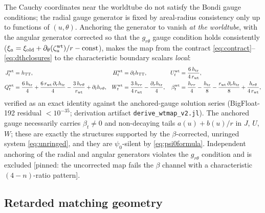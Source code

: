 \begin{nfblock}
The Cauchy coordinates near the worldtube do not satisfy the Bondi gauge
conditions; the radial gauge generator is fixed by areal-radius
consistency only up to functions of $(u,\theta)$. Anchoring the
generator to vanish \emph{at the worldtube}, with the angular generator
corrected so that the $g_{r\theta}$ gauge condition holds consistently
($\xi_a = \xi_{\rm old} + \partial_\theta(\zeta_u^{\rm wt})/r -
\text{const}$), makes the map from the contract
\eqref{eq:contract}--\eqref{eq:dthclosures} to the characteristic
boundary scalars \emph{local}:
\begin{align}
J_t^{\rm wt} &= h_{\rm TT},
&
H_t^{\rm wt} &= \partial_t h_{\rm TT},
&
U_t^{\rm wt} &= \frac{6\,h_{\rm tr}}{4\,r_{\rm wt}},
\nonumber\\
Q_t^{\rm wt} &= \frac{6\,h_{\rm tr}}{4} + \frac{6\,r_{\rm wt}\,
\partial_rh_{\rm tr}}{4}
 - \frac{3\,h_{r\theta}}{r_{\rm wt}} + \partial_t h_{r\theta},
&
W_t^{\rm wt} &= \frac{3\,h_{rr}}{4\,r_{\rm wt}}
 - \frac{\partial_rh_{\rm tr}}{4},
&
\beta_t^{\rm wt} &= \frac{h_{rr}}{4} - \frac{h_{\rm tr}}{8}
 - \frac{r_{\rm wt}\,\partial_rh_{\rm tr}}{8}
 + \frac{h_{r\theta}}{4\,r_{\rm wt}},
\label{eq:sixrowmap}
\end{align}
verified as an exact identity against the anchored-gauge solution
series (BigFloat-192 residual $<10^{-35}$; derivation artifact
\texttt{derive\_wtmap\_v2.jl}). The anchored gauge necessarily carries
$\beta_t \neq 0$ and non-decaying tails $a(u) + b(u)/r$ in $J$, $U$,
$W$; these are exactly the structures supported by the
$\beta$-corrected, unringed system \eqref{eq:unringed}, and they are
$\psi_0$-silent by \eqref{eq:psi0formula}. Independent anchoring of the
radial and angular generators violates the $g_{r\theta}$ condition and
is excluded [pinned: the uncorrected map fails the $\beta$ channel with
a characteristic $(4-n)$-ratio pattern].
\end{nfblock}

\subsection{Retarded matching geometry}
\label{sec:retarded}

